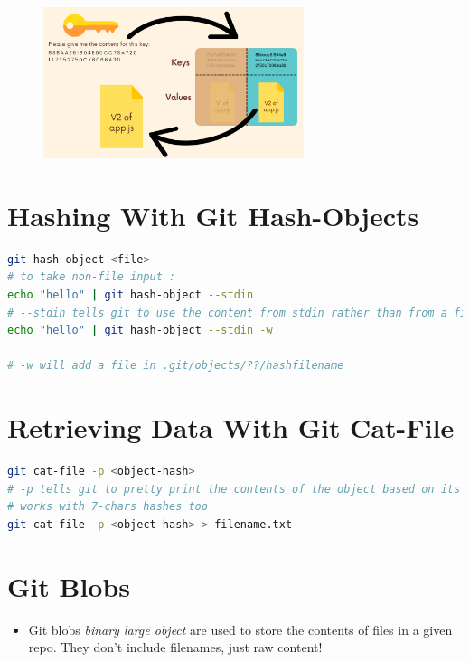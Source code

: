\documentclass{report}
\begin{document}
\begin{figure}[H] 
	 \centering 
	 \includegraphics[width=3in]{screenshots/2022-07-10T15-18-37Z.png} 
\end{figure}

\section{Hashing With Git Hash-Objects}

\begin{tcolorbox}[title=Try Hashing,colback=backcolour]
\begin{lstlisting}[language=bash]
git hash-object <file>
# to take non-file input :
echo "hello" | git hash-object --stdin
# --stdin tells git to use the content from stdin rather than from a file
echo "hello" | git hash-object --stdin -w

# -w will add a file in .git/objects/??/hashfilename
\end{lstlisting}
\end{tcolorbox}

\section{Retrieving Data With Git Cat-File}

\begin{tcolorbox}[title=Retrieve Data,colback=backcolour]
\begin{lstlisting}[language=bash]
git cat-file -p <object-hash>
# -p tells git to pretty print the contents of the object based on its type
# works with 7-chars hashes too
git cat-file -p <object-hash> > filename.txt
\end{lstlisting}
\end{tcolorbox}

\section{Git Blobs}

\begin{itemize}
	\item Git blobs \textit{binary large object} are used to store the contents of files in a given repo. They don't include filenames, just raw content!
\end{itemize}
\end{document}
